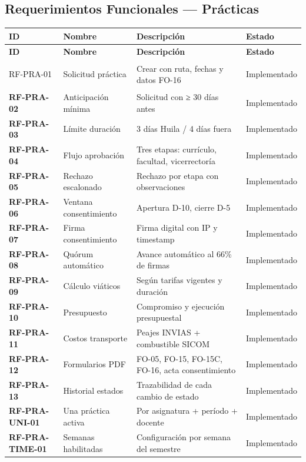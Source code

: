 \documentclass[12pt,a4paper]{article}
\begin{document}
\subsection{Requerimientos Funcionales — Prácticas}

\begin{longtable}{>{\bfseries}p{2.2cm} p{4cm} p{6.5cm} p{1.5cm}}
  \toprule
  \textbf{ID} & \textbf{Nombre} & \textbf{Descripción} & \textbf{Estado} \\
  \midrule
  \endfirsthead
  \toprule \textbf{ID} & \textbf{Nombre} & \textbf{Descripción} & \textbf{Estado} \\ \midrule
  \endhead

  RF-PRA-01 & Solicitud práctica & Crear con ruta, fechas y datos FO-16 & \textcolor{green!50!black}{Implementado} \\[3pt]
  RF-PRA-02 & Anticipación mínima & Solicitud con ≥ 30 días antes & \textcolor{green!50!black}{Implementado} \\[3pt]
  RF-PRA-03 & Límite duración & 3 días Huila / 4 días fuera & \textcolor{green!50!black}{Implementado} \\[3pt]
  RF-PRA-04 & Flujo aprobación & Tres etapas: currículo, facultad, vicerrectoría & \textcolor{green!50!black}{Implementado} \\[3pt]
  RF-PRA-05 & Rechazo escalonado & Rechazo por etapa con observaciones & \textcolor{green!50!black}{Implementado} \\[3pt]
  RF-PRA-06 & Ventana consentimiento & Apertura D-10, cierre D-5 & \textcolor{green!50!black}{Implementado} \\[3pt]
  RF-PRA-07 & Firma consentimiento & Firma digital con IP y timestamp & \textcolor{green!50!black}{Implementado} \\[3pt]
  RF-PRA-08 & Quórum automático & Avance automático al 66\% de firmas & \textcolor{green!50!black}{Implementado} \\[3pt]
  RF-PRA-09 & Cálculo viáticos & Según tarifas vigentes y duración & \textcolor{green!50!black}{Implementado} \\[3pt]
  RF-PRA-10 & Presupuesto & Compromiso y ejecución presupuestal & \textcolor{green!50!black}{Implementado} \\[3pt]
  RF-PRA-11 & Costos transporte & Peajes INVIAS + combustible SICOM & \textcolor{green!50!black}{Implementado} \\[3pt]
  RF-PRA-12 & Formularios PDF & FO-05, FO-15, FO-15C, FO-16, acta consentimiento & \textcolor{green!50!black}{Implementado} \\[3pt]
  RF-PRA-13 & Historial estados & Trazabilidad de cada cambio de estado & \textcolor{green!50!black}{Implementado} \\[3pt]
  RF-PRA-UNI-01 & Una práctica activa & Por asignatura + período + docente & \textcolor{green!50!black}{Implementado} \\[3pt]
  RF-PRA-TIME-01 & Semanas habilitadas & Configuración por semana del semestre & \textcolor{green!50!black}{Implementado} \\

  \bottomrule
\end{longtable}
\end{document}
